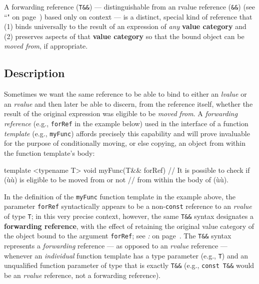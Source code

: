 \label{forwarding-references}

A forwarding reference (\texttt{T\&\&}) --- distinguishable from an
rvalue reference (\texttt{\&\&}) (see ``" on page~\pageref{Rvalue-References}) based only on context
--- is a distinct, special kind of reference that (1) binds
universally to the result of an expression of \emph{any} \textbf{value
category} and (2) preserves aspects of that \textbf{value category} so
that the bound object can be \emph{moved from}, if appropriate.

\subsection[Description]{Description}\label{description-forwardingref}

Sometimes we want the same reference to be able to bind to either an
\emph{lvalue} or an \emph{rvalue} and then later be able to discern,
from the reference itself, whether the result of the original expression
was eligible to be \emph{moved from}. A \emph{forwarding reference}
(e.g., \texttt{forRef} in the example below) used in the interface of a function
\emph{template} (e.g., \texttt{myFunc}) affords precisely this
capability and will prove invaluable for the purpose of conditionally
moving, or else copying, an object from within the function template's
body:

\begin{emcppslisting}
template <typename T>
void myFunc(T&& forRef)
{
    // It is possible to check if (ù{}ù) is eligible to be moved from or not
    // from within the body of (ù{}ù).
}
\end{emcppslisting}

\noindent In the definition of the \texttt{myFunc} function template in the example above, the
parameter \texttt{forRef} syntactically appears to be a
non-\texttt{const} reference to an \emph{rvalue} of type \texttt{T}; in
this very precise context, however, the same \texttt{T\&\&} syntax
designates a \textbf{forwarding reference}, with the effect of retaining
the original value category of the object bound to the argument
\texttt{forRef}; see \textit{: } on page~\pageref{identifying-forwarding-references}. The \texttt{T\&\&} syntax
represents a \emph{forwarding} reference --- as opposed to an
\emph{rvalue} reference --- whenever an \emph{individual} function template has a type parameter (e.g., \texttt{T}) and
an unqualified function parameter of type that is exactly
\texttt{T\&\&} (e.g., \texttt{const}~\texttt{T\&\&} would be an
  \emph{rvalue} reference, not a forwarding reference).

